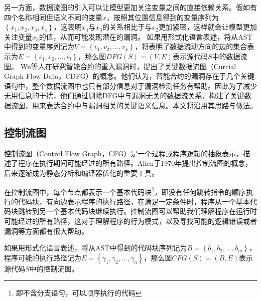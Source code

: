 
另一方面，数据流图的引入可以让模型更加关注变量之间的直接依赖关系。假如有四个名称相同但语义不同的变量$x$，按照其位置信息得到的变量序列为$\left\{x_1, x_2, x_3, x_4\right\}$，这表明$x_4$与$x_3$的关系相比于与$x_2$更加紧密，这样就会让模型更加关注变量$x_3$的值，从而可能发现潜在的漏洞。
如果用形式化语言表述，将从AST中得到的变量序列记为$V=\left\{v_1, v_2, \ldots, v_k\right\}$，将表明了数据流动方向的边的集合表示为$E=\left\{\varepsilon_1, \varepsilon_2, \ldots, \varepsilon_l\right\}$，那么图$DFG(S)=(V, E)$表示源代码$S$中的数据流图。
Wu等人\cite{wu2021peculiar}在研究智能合约的重入漏洞时，提出了关键数据流图（Curcial Graph Flow Data，CDFG）的概念。他们认为，智能合约的漏洞存在于几个关键语句中，整个数据流图中也只有部分信息对于漏洞检测任务有帮助。因此为了减少无用信息的干扰，他们通过剔除DFG中与漏洞无关的数据流关系，构建了关键数据流图，用来表达合约中与漏洞相关的关键语义信息。本文将沿用其思路与做法。
\subsection{控制流图}
\label{sec:控制流图}

控制流图（Control Flow Graph，CFG）是一个过程或程序逻辑的抽象表示，描述了程序在执行期间可能经过的所有路径。Allen于1970年提出控制流图的概念\cite{allencfg}，后来逐渐成为静态分析和编译器优化的重要工具。

在控制流图中，每个节点都表示一个基本代码块\footnote{即不含分支语句，可以顺序执行的代码}，即没有任何跳转指令的顺序执行的代码块，有向边表示程序的执行路径，在满足一定条件时，程序从一个基本代码块跳转到另一个基本代码块继续执行。控制流图可以帮助我们理解程序在运行时可能经过的所有路径，这对于理解程序的行为模式，以及寻找可能的逻辑错误或者漏洞等方面都有很大帮助。

如果用形式化语言表述，将从AST中得到的代码块序列记为$B=\left\{b_1, b_2,\ldots, b_m\right\}$，程序可能的执行路径记为$E=\left\{\gamma_1, \gamma_2, \ldots, \gamma_n\right\}$，那么图$CFG(S)=(B, E)$表示源代码$S$中的控制流图。




